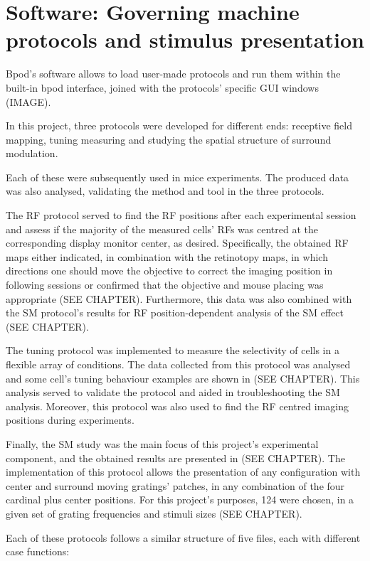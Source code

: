 \section{Software: Governing machine protocols and stimulus presentation}
\label{sec:sectionc}

Bpod's software allows to load user-made protocols and run them within the built-in bpod interface, joined with the protocols' specific GUI windows (IMAGE).

In this project, three protocols were developed for different ends: receptive field mapping, tuning measuring and studying the spatial structure of surround modulation.

Each of these were subsequently used in mice experiments. The produced data was also analysed, validating the method and tool in the three protocols. 

The RF protocol served to find the RF positions after each experimental session and assess if the majority of the measured cells' RFs was centred at the corresponding display monitor center, as desired. Specifically, the obtained RF maps either indicated, in combination with the retinotopy maps, in which directions one should move the objective to correct the imaging position in following sessions or confirmed that the objective and mouse placing was appropriate (SEE CHAPTER). Furthermore, this data was also combined with the SM protocol's results for RF position-dependent analysis of the SM effect (SEE CHAPTER).

The tuning protocol was implemented to measure the selectivity of cells in a flexible array of conditions. The data collected from this protocol was analysed and some cell's tuning behaviour examples are shown in (SEE CHAPTER). This analysis served to validate the protocol and aided in troubleshooting the SM analysis. Moreover, this protocol was also used to find the RF centred imaging positions during experiments. 

Finally, the SM study was the main focus of this project's experimental component, and the obtained results are presented in (SEE CHAPTER). The implementation of this protocol allows the presentation of any configuration with center and surround moving gratings' patches, in any combination of the four cardinal plus center positions. For this project's purposes, 124 were chosen, in a given set of grating frequencies and stimuli sizes (SEE CHAPTER).

Each of these protocols follows a similar structure of five files, each with different case functions:


